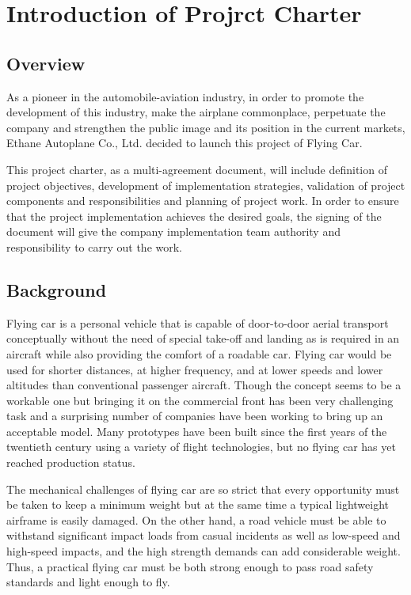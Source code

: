 \chapter{Introduction of Projrct Charter}

\section{Overview}

As a pioneer in the automobile-aviation industry, in order to promote the development of this industry, make the airplane commonplace, perpetuate the company and strengthen the public image and its position in the current markets, Ethane Autoplane Co., Ltd. decided to launch this project of Flying Car. 

This project charter, as a multi-agreement document, will include definition of project objectives, development of implementation strategies, validation of project components and responsibilities and planning of project work. In order to ensure that the project implementation achieves the desired goals, the signing of the document will give the company implementation team authority and responsibility to carry out the work.


\section{Background}

Flying car is a personal vehicle that is capable of door-to-door aerial transport conceptually without the need of special take-off and landing as is required in an aircraft while also providing the comfort of a roadable car. Flying car would be used for shorter distances, at higher frequency, and at lower speeds and lower altitudes than conventional passenger aircraft. Though the concept seems to be a workable one but bringing it on the commercial front has been very challenging task and a surprising number of companies have been working to bring up an acceptable model. Many prototypes have been built since the first years of the twentieth century using a variety of flight technologies, but no flying car has yet reached production status.

The mechanical challenges of flying car are so strict that every opportunity must be taken to keep a minimum weight but at the same time a typical lightweight airframe is easily damaged. On the other hand, a road vehicle must be able to withstand significant impact loads from casual incidents as well as low-speed and high-speed impacts, and the high strength demands can add considerable weight. Thus, a practical flying car must be both strong enough to pass road safety standards and light enough to fly. 

